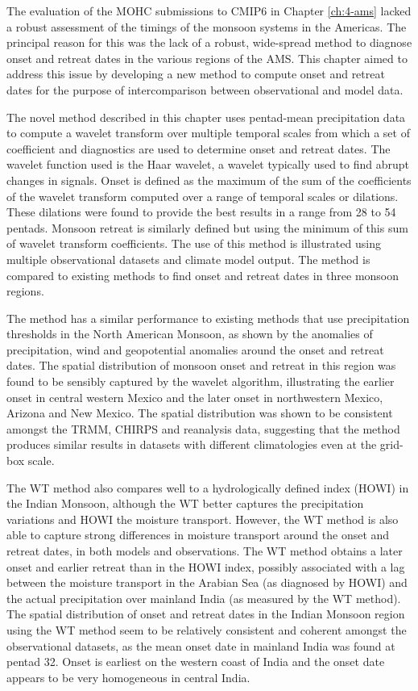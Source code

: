 The evaluation of the MOHC submissions to CMIP6 in Chapter \ref{ch:4-ams} lacked a robust assessment of the timings of the monsoon systems in the Americas. 
The principal reason for this was the lack of a robust, wide-spread method to diagnose onset and retreat dates in the various regions of the AMS. This chapter aimed to address this issue by developing a new method to compute onset and retreat dates for the purpose of intercomparison between observational and model data.

The novel method described in this chapter uses pentad-mean precipitation data to compute a wavelet transform over multiple temporal scales from which a set of coefficient and diagnostics are used to determine onset and retreat dates. The wavelet function used is the Haar wavelet, a wavelet typically used to find abrupt changes in signals.
Onset is defined as the maximum of the sum of the coefficients of the wavelet transform computed over a range of temporal scales or dilations. These dilations were found to provide the best results in a range from 28 to 54 pentads. Monsoon retreat is similarly defined but using the minimum of this sum of wavelet transform coefficients. The use of this method is illustrated using multiple observational datasets and climate model output. The method is compared to existing methods to find onset and retreat dates in three monsoon regions.

The method has a similar performance to existing methods that use precipitation thresholds in the North American Monsoon, as shown by the anomalies of precipitation, wind and geopotential anomalies around the onset and retreat dates. 
The spatial distribution of monsoon onset and retreat in this region was found to be sensibly captured by the wavelet algorithm, illustrating the earlier onset in central western Mexico and the later onset in northwestern Mexico, Arizona and New Mexico. The spatial distribution was shown to be consistent amongst the TRMM, CHIRPS and reanalysis data, suggesting that the method produces similar results in datasets with different climatologies even at the grid-box scale.
 
The WT method also compares well to a hydrologically defined index (HOWI) in the Indian Monsoon, although the WT better captures the precipitation variations and HOWI the moisture transport. However, the WT method is also able to capture strong differences in moisture transport around the onset and retreat dates, in both models and observations. The WT method obtains a later onset and earlier retreat than in the HOWI index, possibly associated with a lag between the moisture transport in the Arabian Sea (as diagnosed by HOWI) and the actual precipitation over mainland India (as measured by the WT method). The spatial distribution of onset and retreat dates in the Indian Monsoon region using the WT method seem to be relatively consistent and coherent amongst the observational datasets, as the mean onset date in mainland India was found at pentad 32.
Onset is earliest on the western coast of India and the onset date appears to be very homogeneous in central India.

